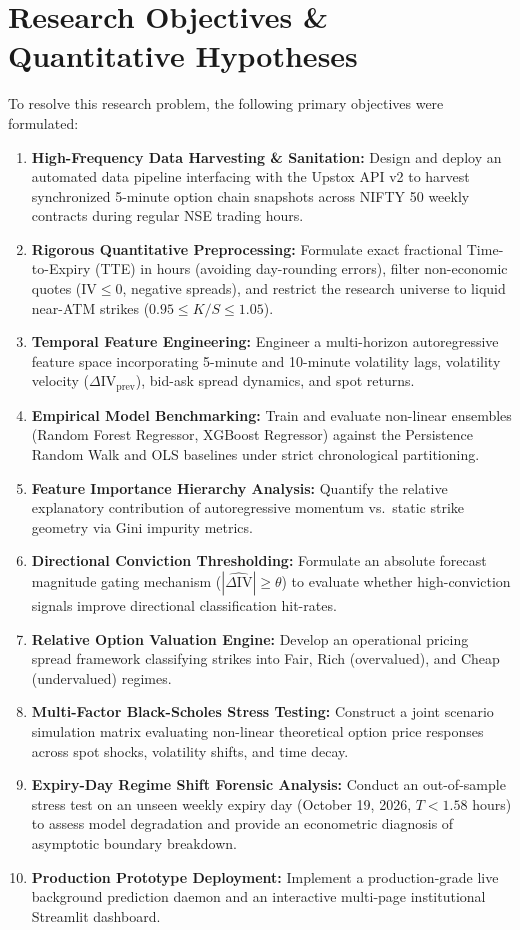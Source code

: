 \section{Research Objectives \& Quantitative Hypotheses}
\label{sec:research_objectives}

To resolve this research problem, the following primary objectives were formulated:
\begin{enumerate}
    \item \textbf{High-Frequency Data Harvesting \& Sanitation:} Design and deploy an automated data pipeline interfacing with the Upstox API v2 to harvest synchronized 5-minute option chain snapshots across NIFTY 50 weekly contracts during regular NSE trading hours.
    \item \textbf{Rigorous Quantitative Preprocessing:} Formulate exact fractional Time-to-Expiry (TTE) in hours (avoiding day-rounding errors), filter non-economic quotes ($\text{IV} \le 0$, negative spreads), and restrict the research universe to liquid near-ATM strikes ($0.95 \le K/S \le 1.05$).
    \item \textbf{Temporal Feature Engineering:} Engineer a multi-horizon autoregressive feature space incorporating 5-minute and 10-minute volatility lags, volatility velocity ($\Delta \text{IV}_{\text{prev}}$), bid-ask spread dynamics, and spot returns.
    \item \textbf{Empirical Model Benchmarking:} Train and evaluate non-linear ensembles (Random Forest Regressor, XGBoost Regressor) against the Persistence Random Walk and OLS baselines under strict chronological partitioning.
    \item \textbf{Feature Importance Hierarchy Analysis:} Quantify the relative explanatory contribution of autoregressive momentum vs.\ static strike geometry via Gini impurity metrics.
    \item \textbf{Directional Conviction Thresholding:} Formulate an absolute forecast magnitude gating mechanism ($|\widehat{\Delta \text{IV}}| \ge \theta$) to evaluate whether high-conviction signals improve directional classification hit-rates.
    \item \textbf{Relative Option Valuation Engine:} Develop an operational pricing spread framework classifying strikes into Fair, Rich (overvalued), and Cheap (undervalued) regimes.
    \item \textbf{Multi-Factor Black-Scholes Stress Testing:} Construct a joint scenario simulation matrix evaluating non-linear theoretical option price responses across spot shocks, volatility shifts, and time decay.
    \item \textbf{Expiry-Day Regime Shift Forensic Analysis:} Conduct an out-of-sample stress test on an unseen weekly expiry day (October 19, 2026, $T < 1.58$ hours) to assess model degradation and provide an econometric diagnosis of asymptotic boundary breakdown.
    \item \textbf{Production Prototype Deployment:} Implement a production-grade live background prediction daemon and an interactive multi-page institutional Streamlit dashboard.
\end{enumerate}

